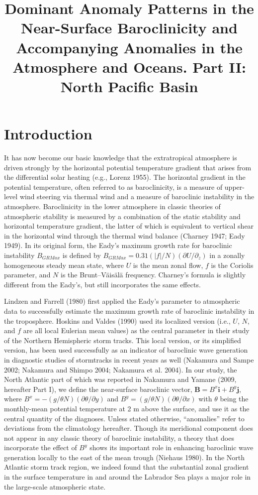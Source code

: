 \documentclass{ametsoc}
\title{Dominant Anomaly Patterns in the Near-Surface 
Baroclinicity and Accompanying
Anomalies in the Atmosphere and Oceans. 
Part II: North Pacific Basin}
\affiliation{Japan Agency for Marine-Earth Science and Technology, Yokohama,
Kanagawa, Japan}
\begin{document}
\maketitle


\section{Introduction}

It has now become our basic
knowledge that the extratropical
atmosphere is driven strongly by the horizontal
potential temperature gradient that arises from the
differential solar heating (e.g., Lorenz 1955). The horizontal
gradient in the potential temperature, often referred
to as baroclinicity, is a measure of upper-level wind
steering via thermal wind and a measure of baroclinic
instability in the atmosphere. Baroclinicity in the lower
atmosphere in classic theories of atmospheric stability is
measured by a combination of the static stability and
horizontal temperature gradient, the latter of which is
equivalent to vertical shear in the horizontal wind through
the thermal wind balance (Charney 1947; Eady 1949). In
its original form, the Eady's maximum growth rate for
baroclinic instability $B_{GRMax}$ is defined by $B_{GRMax} =
0.31(|f|/N)(\partial U/\partial_z)$ in a zonally homogeneous steady
mean state, where $U$ is the mean zonal flow, $f$ is the
Coriolis parameter, and $N$ is the Brunt--V\"ais\"al\"a frequency.
Charney's formula is slightly different from the Eady's,
but still incorporates the same effects.


Lindzen and Farrell (1980) first applied the Eady's parameter
to atmospheric data to successfully estimate the
maximum growth rate of baroclinic instability in the troposphere.
Hoskins and Valdes (1990) used its localized
version (i.e., $U$, $N$, and $f$ are all local Eulerian mean values)
as the central parameter in their study of the Northern
Hemispheric storm tracks. This local version, or its simplified
version, has been used successfully as an indicator
of baroclinic wave generation in diagnostic studies of
stormtracks in recent years as well (Nakamura and Sampe
2002; Nakamura and Shimpo 2004; Nakamura et al. 2004).
In our study, the North Atlantic part of which was reported
in Nakamura and Yamane (2009, hereafter Part I), we
define the near-surface baroclinic vector, $\mathbf{B}=B^x\mathbf{i} + 
B^y\mathbf{j}$,
where $B^x= -(g/\theta N)(\partial\theta/\partial y)$ 
and $B^y = (g/\theta N)(\partial\theta/\partial x)$  with
$\theta$ being the monthly-mean potential temperature at 2 m
above the surface, and use it as the central quantity of the
diagnoses. Unless stated otherwise, ``anomalies'' refer to
deviations from the climatology hereafter. Though its meridional
component does not appear in any classic theory of
baroclinic instability, a theory that does incorporate the
effect of $B^y$ shows its important role in enhancing baroclinic
wave generation locally to the east of the mean trough
(Niehaus 1980). In the North Atlantic storm track region,
we indeed found that the substantial zonal gradient in the
surface temperature in and around the Labrador Sea plays
a major role in the large-scale atmospheric state.
\end{document}
